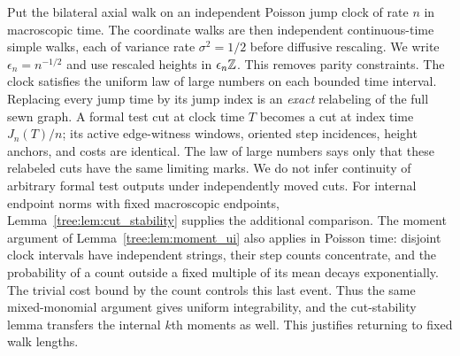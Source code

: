 Put the bilateral axial walk on an independent Poisson jump clock of
rate $n$ in macroscopic time.
The coordinate walks are then independent continuous-time simple walks,
each of variance rate $\sigma^2=1/2$ before diffusive rescaling.  We write
$\epsilon_n=n^{-1/2}$ and use rescaled heights in
$\epsilon_n\mathbb Z$.  This removes parity constraints.  The clock satisfies
the uniform law of large numbers on each bounded time interval.
Replacing every jump time by its jump index is an \emph{exact}
relabeling of the full sewn graph.  A formal test cut at clock time
$T$ becomes a cut at index time $J_n(T)/n$; its active edge-witness
windows, oriented step incidences, height anchors, and costs are
identical.  The law of large numbers says only that these relabeled
cuts have the same limiting marks.  We do not infer continuity of
arbitrary formal test outputs under independently moved cuts.
For internal endpoint norms with fixed macroscopic endpoints,
Lemma~\ref{tree:lem:cut_stability} supplies the additional comparison.
The moment argument of Lemma~\ref{tree:lem:moment_ui} also applies in
Poisson time: disjoint clock intervals have independent strings,
their step counts concentrate, and the probability of a count
outside a fixed multiple of its mean decays exponentially.  The
trivial cost bound by the count controls this last event.  Thus
the same mixed-monomial argument gives uniform integrability, and
the cut-stability lemma transfers the internal $k$th moments as
well.  This justifies returning to fixed walk lengths.


